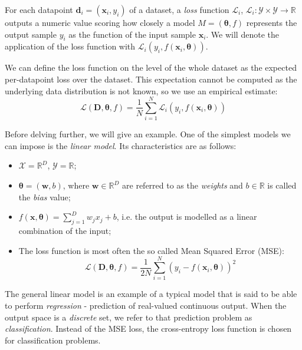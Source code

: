 \begin{definition}
For each datapoint $\pmb{d}_i=(\pmb{x}_i, y_i)$ of a dataset, a \emph{loss} function $\mathcal{L}_{i}$, $\mathcal{L}_{i}: \mathcal{Y} \times \mathcal{Y} \to \mathbb{R} $ outputs a numeric value scoring how closely a model $M = (\pmb{\theta}, f)$ represents the output sample $y_i$ as the function of the input sample $\pmb{x}_i$. We will denote the application of the loss function with $\mathcal{L}_{i}(y_i, f(\pmb{x}_i, \pmb{\theta}))$.

We can define the loss function on the level of the whole dataset as the expected per-datapoint loss over the dataset. This expectation cannot be computed as the underlying data distribution is not known, so we use an empirical estimate: \begin{equation}
\mathcal{L}(\pmb{D}, \pmb{\theta}, f) = \frac{1}{N}\sum_{i=1}^{N}{\mathcal{L}_{i}(y_i, f(\pmb{x}_i, \pmb{\theta}))}
\end{equation}
\end{definition}

Before delving further, we will give an example. One of the simplest models we can impose is the \emph{linear model}. Its characteristics are as follows:
\begin{itemize}
\item $\mathcal{X} = \mathbb{R}^D$, $\mathcal{Y}=\mathbb{R}$;
\item $\pmb{\theta} = (\pmb{w}, b)$, where $\pmb{w} \in \mathbb{R}^D$ are referred to as the \emph{weights} and $b \in \mathbb{R}$ is called the \emph{bias} value;
\item $f(\pmb{x}, \pmb{\theta}) = \sum_{j=1}^{D}{w_j x_j} + b$, i.e. the output is modelled as a linear combination of the input;
\item The loss function is most often the so called Mean Squared Error (MSE): \begin{equation}
\mathcal{L}(\pmb{D}, \pmb{\theta}, f) = \frac{1}{2N}\sum_{i=1}^{N}{(y_i - f(\pmb{x}_i, \pmb{\theta}))^2}
\end{equation}
\end{itemize}

The general linear model is an example of a typical model that is said to be able to perform \emph{regression} - prediction of real-valued continuous output. When the output space is a \emph{discrete} set, we refer to that prediction problem as \emph{classification}. Instead of the MSE loss, the cross-entropy loss function is chosen for classification problems.


